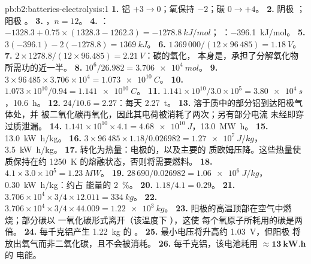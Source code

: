 \begin{solution}{pb:b2:batteries-electrolysis:1}
\textbf{1.} 铝 $+3 \to 0$；氧保持 $-2$；碳 $0 \to +4$。
\textbf{2.} 阴极 ；阳极 。
\textbf{3.} ，$n = 12$。
\textbf{4.} ：$-1328.3 + 0.75 \times (1328.3 - 1262.3) = \qty{-1278.8}{kJ/mol}$；
：\qty{-396.1}{kJ/mol}。
\textbf{5.} $3(-396.1) - 2(-1278.8) = \qty{+1369}{kJ}$。
\textbf{6.} $1\,369\,000/(12 \times 96\,485) = \qty{1.18}{V}$。
\textbf{7.} $2 \times 1278.8/(12 \times 96.485) = \qty{2.21}{V}$：碳的氧化，
本身是，承担了分解氧化物所需功的近一半。
\textbf{8.} $10^6/26.982 = \qty{3.706e4}{mol}$。
\textbf{9.} $3 \times 96\,485 \times 3.706 \times 10^4 = \qty{1.073e10}{C}$。
\textbf{10.} $1.073 \times 10^{10}/0.94 = \qty{1.141e10}{C}$。
\textbf{11.} $1.141 \times 10^{10}/3.0 \times 10^5 = \qty{3.80e4}{s}$，\qty{10.6}{h}。
\textbf{12.} $24/10.6 = 2.27$：每天 \qty{2.27}{t}。
\textbf{13.} 溶于质中的部分铝到达阳极气体处，并
被二氧化碳再氧化，因此其电荷被消耗了两次；另有部分电流
未经即穿过质泄漏。
\textbf{14.} $1.141 \times 10^{10} \times 4.1 = \qty{4.68e10}{J}$，\qty{13.0}{MW.h}。
\textbf{15.} \qty{13.0}{kW.h/kg}。
\textbf{16.} $3 \times 96\,485 \times 1.18/0.026982 = \qty{1.27e7}{J/kg}$，\qty{3.5}{kW.h/kg}。
\textbf{17.} 转化为热量：电极的，以及主要的
质欧姆压降。这些热量使质保持在约
\qty{1250}{K} 的熔融状态，否则将需要燃料。
\textbf{18.} $4.1 \times 3.0 \times 10^5 = \qty{1.23}{MW}$。
\textbf{19.} $28\,690/0.026982 = \qty{1.06e6}{J/kg}$，\qty{0.30}{kW.h/kg}：约占
能量的 2~\%。
\textbf{20.} $1.18/4.1 = 0.29$。
\textbf{21.} $3.706 \times 10^4 \times 3/4 \times 12.011 = \qty{334}{kg}$。
\textbf{22.} $3.706 \times 10^4 \times 3/4 \times 44.009 = \qty{1.22e3}{kg}$。
\textbf{23.} 阳极的高温顶部在空气中燃烧；部分碳以
一氧化碳形式离开（该温度下 ），这使
每个氧原子所耗用的碳是两倍。
\textbf{24.} 每千克铝产生 \qty{1.22}{kg} 的 。
\textbf{25.} 最小电压将升高约 \qty{1.03}{V}，但阳极
将放出氧气而非二氧化碳，且不会被消耗。
\textbf{26.} 每千克铝，该电池耗用 $\boldsymbol{\approx \qty{13}{kW.h}}$ 的
电能。
\end{solution}

